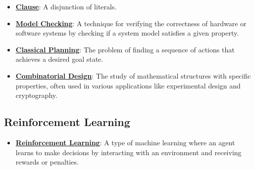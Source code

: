 \documentclass{article}%
\begin{document}
\begin{itemize}[leftmargin=*]
\item \href{https://purdue.brightspace.com/d2l/common/assets/pdfjs-d2l-dist/1.0.14-legacy/web/viewer.html?file=\%2Fcontent\%2Fenforced\%2F1095467-wl.202510.CS.24300.001\%2F13L1-Logic.pdf\%3Fou\%3D1095467\&lang=en-us\&container=d2l-fileviewer-rendered-pdf\&fullscreen=d2l-fileviewer-rendered-pdf-dialog\&height=667#page=16}{\textbf{Clause}}: A disjunction of literals.%
\item \href{https://purdue.brightspace.com/d2l/common/assets/pdfjs-d2l-dist/1.0.14-legacy/web/viewer.html?file=\%2Fcontent\%2Fenforced\%2F1095467-wl.202510.CS.24300.001\%2F13L1-Logic.pdf\%3Fou\%3D1095467\&lang=en-us\&container=d2l-fileviewer-rendered-pdf\&fullscreen=d2l-fileviewer-rendered-pdf-dialog\&height=667#page=20}{\textbf{Model Checking}}: A technique for verifying the correctness of hardware or software systems by checking if a system model satisfies a given property.%
\item \href{https://purdue.brightspace.com/d2l/common/assets/pdfjs-d2l-dist/1.0.14-legacy/web/viewer.html?file=\%2Fcontent\%2Fenforced\%2F1095467-wl.202510.CS.24300.001\%2F13L1-Logic.pdf\%3Fou\%3D1095467\&lang=en-us\&container=d2l-fileviewer-rendered-pdf\&fullscreen=d2l-fileviewer-rendered-pdf-dialog\&height=667#page=21}{\textbf{Classical Planning}}: The problem of finding a sequence of actions that achieves a desired goal state.%
\item \href{https://purdue.brightspace.com/d2l/common/assets/pdfjs-d2l-dist/1.0.14-legacy/web/viewer.html?file=\%2Fcontent\%2Fenforced\%2F1095467-wl.202510.CS.24300.001\%2F13L1-Logic.pdf\%3Fou\%3D1095467\&lang=en-us\&container=d2l-fileviewer-rendered-pdf\&fullscreen=d2l-fileviewer-rendered-pdf-dialog\&height=667#page=22}{\textbf{Combinatorial Design}}: The study of mathematical structures with specific properties, often used in various applications like experimental design and cryptography.%
\end{itemize}

%
\subsection{Reinforcement Learning}%
\label{subsec:ReinforcementLearning}%
\begin{itemize}[leftmargin=*]%
\item \href{https://purdue.brightspace.com/d2l/common/assets/pdfjs-d2l-dist/1.0.14-legacy/web/viewer.html?file=\%2Fcontent\%2Fenforced\%2F1095467-wl.202510.CS.24300.001\%2F02L2-Intro.pdf\%3Fou\%3D1095467\&lang=en-us\&container=d2l-fileviewer-rendered-pdf\&fullscreen=d2l-fileviewer-rendered-pdf-dialog\&height=667#page=46}{\textbf{Reinforcement Learning}}: A type of machine learning where an agent learns to make decisions by interacting with an environment and receiving rewards or penalties.%
\end{itemize}
\end{document}
